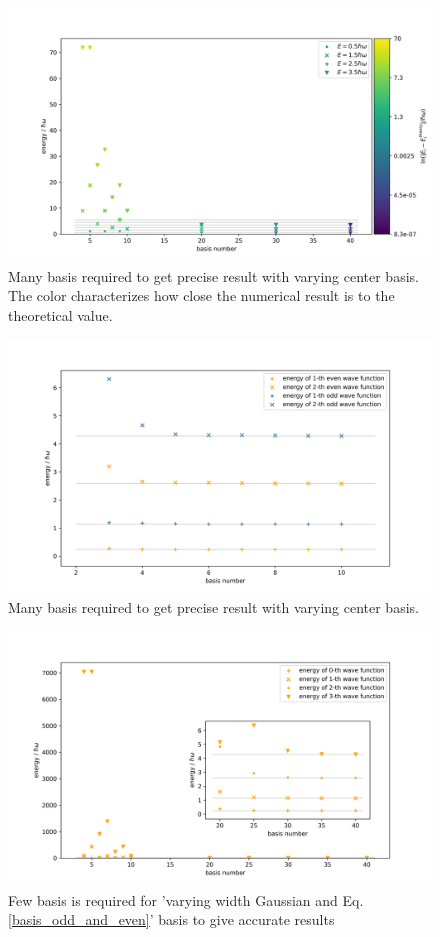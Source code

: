 \documentclass{article}
\begin{document}
\begin{figure}[!htb]
    \centering
    \includegraphics[width=1\textwidth]{V_1_Center_different basis number.png}
    \caption{Many basis required to get precise result with varying center basis. The color characterizes how close the numerical result is to the theoretical value.}
    \label{fig:V1_dif_basis_num_center}
\end{figure}

\begin{figure}[!htb]
    \centering
    \includegraphics[width=1\textwidth]{V2even_and_odd_different_basis.png}
    \caption{Many basis required to get precise result with varying center basis.}
    \label{fig:V2_dif_basis_num_center}
\end{figure}

\begin{figure}[!htb]
    \centering
    \includegraphics[width=1\textwidth]{V2_center_differen_basis.png}
    \caption{Few basis is required for 'varying width Gaussian and Eq.\ref{basis_odd_and_even}' basis to give accurate results}
    \label{fig:V2_dif_basis_num_even_and_odd}
\end{figure}
\end{document}
